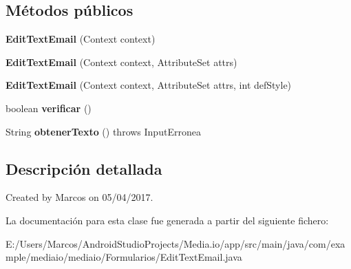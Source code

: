 \subsection*{Métodos públicos}
\begin{DoxyCompactItemize}
\item 
\mbox{\label{classcom_1_1example_1_1mediaio_1_1mediaio_1_1_formularios_1_1_edit_text_email_a7d956f6545237fbc236d9f30d363e05d}} 
{\bfseries Edit\+Text\+Email} (Context context)
\item 
\mbox{\label{classcom_1_1example_1_1mediaio_1_1mediaio_1_1_formularios_1_1_edit_text_email_a9fd943561e03d4c67fffa9a460f113e1}} 
{\bfseries Edit\+Text\+Email} (Context context, Attribute\+Set attrs)
\item 
\mbox{\label{classcom_1_1example_1_1mediaio_1_1mediaio_1_1_formularios_1_1_edit_text_email_aaee93af968f79ddb5a1db8e6440f9f03}} 
{\bfseries Edit\+Text\+Email} (Context context, Attribute\+Set attrs, int def\+Style)
\item 
\mbox{\label{classcom_1_1example_1_1mediaio_1_1mediaio_1_1_formularios_1_1_edit_text_email_adbe98bce2439899d972af33a7ee786ad}} 
boolean {\bfseries verificar} ()
\item 
\mbox{\label{classcom_1_1example_1_1mediaio_1_1mediaio_1_1_formularios_1_1_edit_text_email_a2eaf2fdcb95e45a68e9fc9df91ecb717}} 
String {\bfseries obtener\+Texto} ()  throws Input\+Erronea     
\end{DoxyCompactItemize}


\subsection{Descripción detallada}
Created by Marcos on 05/04/2017. 

La documentación para esta clase fue generada a partir del siguiente fichero\+:\begin{DoxyCompactItemize}
\item 
E\+:/\+Users/\+Marcos/\+Android\+Studio\+Projects/\+Media.\+io/app/src/main/java/com/example/mediaio/mediaio/\+Formularios/Edit\+Text\+Email.\+java\end{DoxyCompactItemize}
